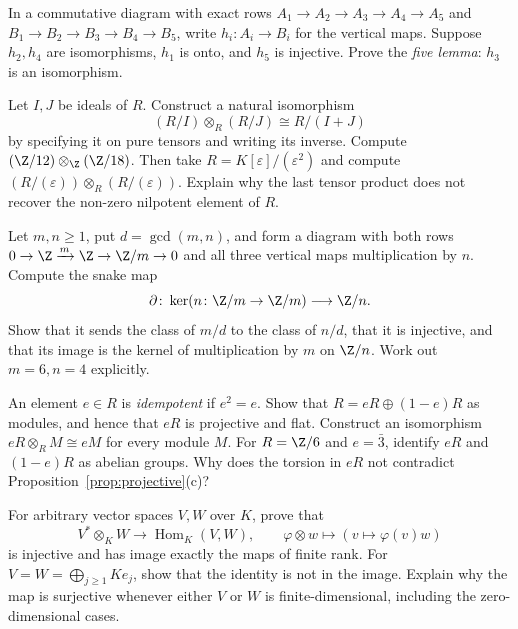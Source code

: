 \begin{exercise}[$\star\star$]\label{ex:fivelemma}
In a commutative diagram with exact rows $A_1\to A_2\to A_3\to A_4\to A_5$ and $B_1\to B_2\to B_3\to B_4\to B_5$, write $h_i\colon A_i\to B_i$ for the vertical maps. Suppose $h_2,h_4$ are isomorphisms, $h_1$ is onto, and $h_5$ is injective. Prove the \emph{five lemma}: $h_3$ is an isomorphism.
\end{exercise}

\begin{exercise}[$\star\star$]\label{ex:v10new-ch03-quotients}
Let $I,J$ be ideals of $R$. Construct a natural isomorphism
\[
(R/I)\otimes_R(R/J)\cong R/(I+J)
\]
by specifying it on pure tensors and writing its inverse. Compute $(\Z/12)\otimes_\Z(\Z/18)$. Then take $R=K[\varepsilon]/(\varepsilon^2)$ and compute $(R/(\varepsilon))\otimes_R(R/(\varepsilon))$. Explain why the last tensor product does not recover the non-zero nilpotent element of $R$.
\end{exercise}

\begin{exercise}[$\star\star$]\label{ex:v10new-ch03-snake}
Let $m,n\ge1$, put $d=\gcd(m,n)$, and form a diagram with both rows $0\to\Z\xrightarrow{m}\Z\to\Z/m\to0$ and all three vertical maps multiplication by $n$. Compute the snake map
\[
\partial\colon\ker(n\colon\Z/m\to\Z/m)\longrightarrow\Z/n.
\]
Show that it sends the class of $m/d$ to the class of $n/d$, that it is injective, and that its image is the kernel of multiplication by $m$ on $\Z/n$. Work out $m=6,n=4$ explicitly.
\end{exercise}

\begin{exercise}[$\star\star$]\label{ex:v10new-ch03-idempotent}
An element $e\in R$ is \emph{idempotent} if $e^2=e$. Show that $R=eR\oplus(1-e)R$ as modules, and hence that $eR$ is projective and flat. Construct an isomorphism $eR\otimes_RM\cong eM$ for every module $M$. For $R=\Z/6$ and $e=\bar3$, identify $eR$ and $(1-e)R$ as abelian groups. Why does the torsion in $eR$ not contradict Proposition~\ref{prop:projective}(c)?
\end{exercise}

\begin{exercise}[$\star\star\star$]\label{ex:v10new-ch03-finiterank}
For arbitrary vector spaces $V,W$ over $K$, prove that
\[
V^*\otimes_KW\longrightarrow\operatorname{Hom}_K(V,W),
\qquad \varphi\otimes w\longmapsto(v\mapsto\varphi(v)w)
\]
is injective and has image exactly the maps of finite rank. For $V=W=\bigoplus_{j\ge1}Ke_j$, show that the identity is not in the image. Explain why the map is surjective whenever either $V$ or $W$ is finite-dimensional, including the zero-dimensional cases.
\end{exercise}


